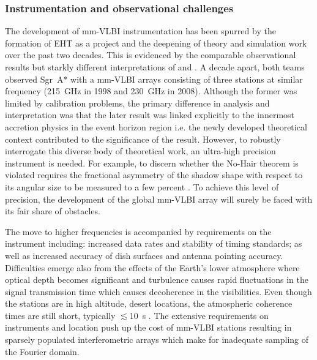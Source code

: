 \subsubsection{Instrumentation and observational challenges}

The development of mm-VLBI instrumentation has been spurred by the formation of EHT as a project and the deepening of theory and simulation work over the past two decades. This is evidenced by the comparable observational results but starkly different interpretations of \citet{Krichbaum_1998} and \citet{Doeleman_2008}. A decade apart, both teams observed Sgr~A* with a mm-VLBI arrays consisting of three stations at similar frequency (215~GHz in 1998 and 230~GHz in 2008). Although the former was limited by calibration problems, the primary difference in analysis and interpretation was that the later result was linked explicitly to the innermost accretion physics in the event horizon region \citep[e.g.][]{Broderick_2011} i.e. the newly developed theoretical context contributed to the significance of the \citet{Doeleman_2008} result. However, to robustly interrogate this diverse body of theoretical work, an ultra-high precision instrument is needed. For example, to discern whether the No-Hair theorem is violated requires the fractional asymmetry of the shadow shape with respect to its angular size to be measured to a few percent \citep{Goddi_2016}. To achieve this level of precision, the development of the global mm-VLBI array will surely be faced with its fair share of obstacles.


The move to higher frequencies is accompanied by requirements on the instrument including: increased data rates and stability of timing standards; as well as increased accuracy of dish surfaces and antenna pointing accuracy. Difficulties emerge also from the effects of the Earth's lower atmosphere where optical depth becomes significant and turbulence causes rapid fluctuations in the signal transmission time which causes decoherence in the visibilities. Even though the stations are in high altitude, desert locations, the atmospheric coherence times are still short, typically $\lesssim$10~s \citep{Doeleman_2009}. The extensive requirements on instruments and location push up the cost of mm-VLBI stations resulting in sparsely populated interferometric arrays which make for inadequate sampling of the Fourier domain. 



